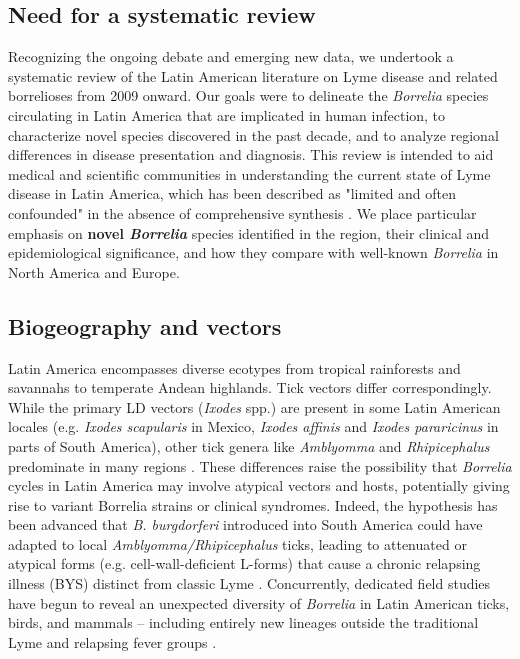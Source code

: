 \documentclass[11pt,letterpaper]{article}
\begin{document}
\subsection{Need for a systematic review}
Recognizing the ongoing debate and emerging new data, we undertook a systematic review of the Latin American literature on Lyme disease and related borrelioses from 2009 onward. Our goals were to delineate the \textit{Borrelia} species circulating in Latin America that are implicated in human infection, to characterize novel species discovered in the past decade, and to analyze regional differences in disease presentation and diagnosis. This review is intended to aid medical and scientific communities in understanding the current state of Lyme disease in Latin America, which has been described as "limited and often confounded" in the absence of comprehensive synthesis \citep{Lucca2024b}. We place particular emphasis on \textbf{novel \textit{Borrelia}} species identified in the region, their clinical and epidemiological significance, and how they compare with well-known \textit{Borrelia} in North America and Europe.

\subsection{Biogeography and vectors}
Latin America encompasses diverse ecotypes from tropical rainforests and savannahs to temperate Andean highlands. Tick vectors differ correspondingly. While the primary LD vectors (\textit{Ixodes} spp.) are present in some Latin American locales (e.g. \textit{Ixodes scapularis} in Mexico, \textit{Ixodes affinis} and \textit{Ixodes pararicinus} in parts of South America), other tick genera like \textit{Amblyomma} and \textit{Rhipicephalus} predominate in many regions \citep{Lucca2024c, Yoshinari2022d}. These differences raise the possibility that \textit{Borrelia} cycles in Latin America may involve atypical vectors and hosts, potentially giving rise to variant Borrelia strains or clinical syndromes. Indeed, the hypothesis has been advanced that \textit{B. burgdorferi} introduced into South America could have adapted to local \textit{Amblyomma/Rhipicephalus} ticks, leading to attenuated or atypical forms (e.g. cell-wall-deficient L-forms) that cause a chronic relapsing illness (BYS) distinct from classic Lyme \citep{Yoshinari2022e, Yoshinari2022f}. Concurrently, dedicated field studies have begun to reveal an unexpected diversity of \textit{Borrelia} in Latin American ticks, birds, and mammals – including entirely new lineages outside the traditional Lyme and relapsing fever groups \citep{Binetruy2020a, Lucca2024d}.
\end{document}
